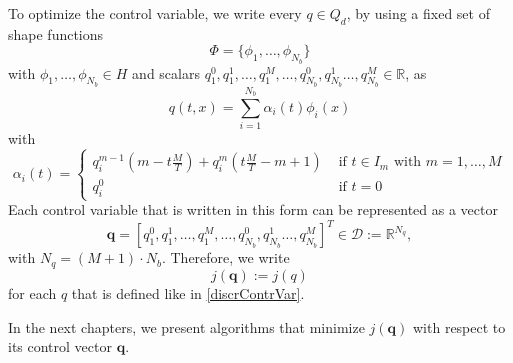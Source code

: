 To optimize the control variable, we write every $q\in Q_d$, by using a fixed set of shape functions
\begin{equation}
\label{basisFuncionsList}
\Phi=\{\phi_1,\dotsc,\phi_{N_b}\}
\end{equation}
 with $\phi_1,\dotsc,\phi_{N_b}\in H$ and scalars $q_1^0,q_1^1,\dotsc,q_1^M,\dotsc,q_{N_b}^0,q_{N_b}^1\dotsc,q_{N_b}^M\in\mathbb{R}$, as
\begin{equation}
\label{discrContrVar}
q(t,x) = \sum_{i=1}^{N_b}\alpha_i(t)\phi_i(x)
\end{equation} 
with
\begin{displaymath}
\alpha_i(t)=\begin{cases}
q_i^{m-1}\left(m-t\frac{M}{T}\right) + q_i^m\left(t\frac{M}{T}-m+1\right) & \text{ if $t\in I_m$ with $m=1,\dotsc,M$}\\
q_i^0 & \text{ if $t=0$}
\end{cases}
\end{displaymath}
Each control variable that is written in this form can be represented as a vector
\begin{displaymath}
\mathbf{q}=\left[q_1^0,q_1^1,\dotsc,q_1^M,\dotsc,q_{N_b}^0,q_{N_b}^1\dotsc,q_{N_b}^M\right]^T\in\mathcal{D}:=\mathbb{R}^{N_q},
\end{displaymath} 
with $N_q = (M+1)\cdot N_b$. Therefore, we write
\begin{displaymath}
j(\mathbf{q}):=j(q)
\end{displaymath}
for each $q$ that is defined like in \eqref{discrContrVar}.

In the next chapters, we present algorithms that minimize $j(\mathbf{q})$ with respect to its control vector $\mathbf{q}$.
































































